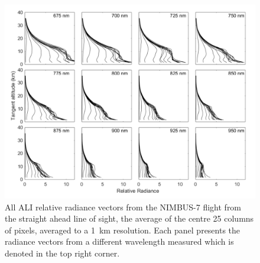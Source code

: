 \begin{figure}
\includegraphics[width=1.0\textwidth]{./Images/5-2-AliRadianceVectors.pdf}
    \caption[ALI Relative Radiance Vectors]{All ALI relative radiance vectors from the NIMBUS-7 flight from the straight ahead line of sight, the average of the centre 25 columns of pixels, averaged to a 1~km resolution. Each panel presents the radiance vectors from a different wavelength measured which is denoted in the top right corner.}
    \label{fig:5.2:AliRadiancesVectors}
\end{figure}

